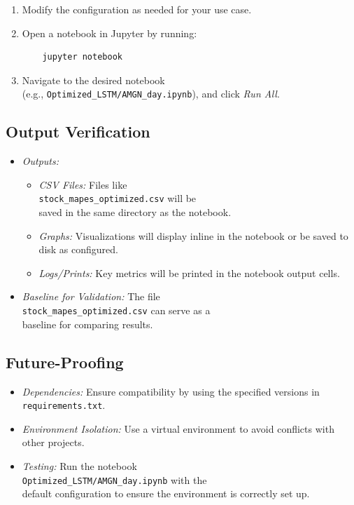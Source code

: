 \documentclass[10pt,twocolumn]{article}
\begin{document}
\begin{enumerate}
    \item Modify the configuration as needed for your use case.
    \item Open a notebook in Jupyter by running:
    \begin{verbatim}
    jupyter notebook
    \end{verbatim}
    \item Navigate to the desired notebook \\ (e.g., \texttt{Optimized\_LSTM/AMGN\_day.ipynb}), and click \textit{Run All}.
\end{enumerate}

\subsection{Output Verification}

\begin{itemize}
    \item \textit{Outputs:}
    \begin{itemize}
        \item \textit{CSV Files:} Files like \\ \texttt{stock\_mapes\_optimized.csv} will be \\ saved in the same directory as the notebook.
        \item \textit{Graphs:} Visualizations will display inline in the notebook or be saved to disk as configured.
        \item \textit{Logs/Prints:} Key metrics will be printed in the notebook output cells.
    \end{itemize}
    \item \textit{Baseline for Validation:} The file \\ \texttt{stock\_mapes\_optimized.csv} can serve as a \\ baseline for comparing results.
\end{itemize}

\subsection{Future-Proofing}

\begin{itemize}
    \item \textit{Dependencies:} Ensure compatibility by using the specified versions in \texttt{requirements.txt}.
    \item \textit{Environment Isolation:} Use a virtual environment to avoid conflicts with other projects.
    \item \textit{Testing:} Run the notebook \\ \texttt{Optimized\_LSTM/AMGN\_day.ipynb} with the \\  default configuration to ensure the environment is correctly set up.
\end{itemize}
\end{document}
